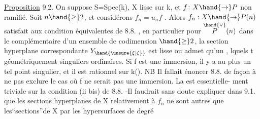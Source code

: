 \uline{Proposition} 9.2. On suppose S=Spec(k), X lisse sur k, et $f\colon X\hand{\to} P$ non
ramifié. Soit $n \hand{\geq} 2$, et considérons $f_n = u_n f$ . Alors $f_n : X \hand{\to} P(n)$
satisfait aux condition équivalentes de 8.8. , en particulier
pour \hand{$\unsure{\xi|\zeta} \in$} $\overset{\hand{\vee}}{P}(n)$ dans le complémentaire d'un ensemble de codimension $\hand{\geq} 2$,
la section hyperplane correspondante $Y_{\hand{\unsure{\xi|\zeta}}}$ est lisse  ou admet qu'un
, lquels t géométriquement singuliers
ordinaires. Si f est une immersion, il y a au
plus un tel point singulier, et il est rationnel sur k(\hand{$\unsure{\xi|\zeta}$}).
 NB Il fallait énoncer 8.8. de façon à  ne pas exclure le
cas où f ne serait pas une immersion. La  est essentielle-%
ment triviale sur la condition (ii bis) de 8.8. -Il faudrait sans doute
expliquer dans 9.1. que les sections hyperplanes de X relativement à
 $f_n$ ne sont autres que les``sections''de X par les hypersurfaces de degré
